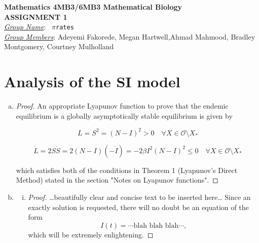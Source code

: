 \documentclass[12pt]{article}
\begin{document}
\begin{center}
{\bfseries Mathematics 4MB3/6MB3 Mathematical Biology\\
 ASSIGNMENT {\color{blue}1}}\\
\medskip
\underline{\emph{Group Name}}: \texttt{{\color{blue} $\pi$rates}}\\
\medskip
\underline{\emph{Group Members}}: {\color{blue}Adeyemi Fakorede, Megan Hartwell,Ahmad Mahmood, Bradley Montgomery, Courtney Mulholland}
\end{center}

\section{Analysis of the SI model}

\SIanalIntro
\begin{enumerate}[(a)]
\item \SIanalQa
  
  {\color{blue}
    \begin{proof}
	      An appropriate Lyapunov function to prove that the endemic equilibrium is a globally asymptotically stable equilibrium is given by 
	      
	      \begin{equation}
	      	L=S^2=(N-I)^2 > 0 \quad \forall X\in\mathcal{O}\setminus{X_*}
	      \end{equation}
	      
	       \begin{equation}
	      	\dot{L}=2S\dot{S}=2(N-I)(-\dot{I})=-2\beta I^2 (N-I)^2 \leq 0 \quad \forall X\in\mathcal{O}\setminus{X_*}
	      \end{equation}
	      
	      which satisfies both of the conditions in Theorem 1 (Lyapunov's Direct Method) stated in the section "Notes on Lyapunov functions".

    \end{proof}
  }
  
\item \SIanalQb
  \begin{enumerate}[(i)]
  \item \SIanalQbi
    
    {\color{blue}
      \begin{proof}
        {\color{magenta}\dots beautifully clear and concise text to be inserted here\dots}
        Since an exactly solution is requested, there will no doubt be an equation of the form
        \begin{equation}
          I(t) = \cdots \text{blah blah blah} \cdots ,
        \end{equation}
        which will be extremely enlightening.
      \end{proof}
    }
    

\end{enumerate}
\end{enumerate}
\end{document}
